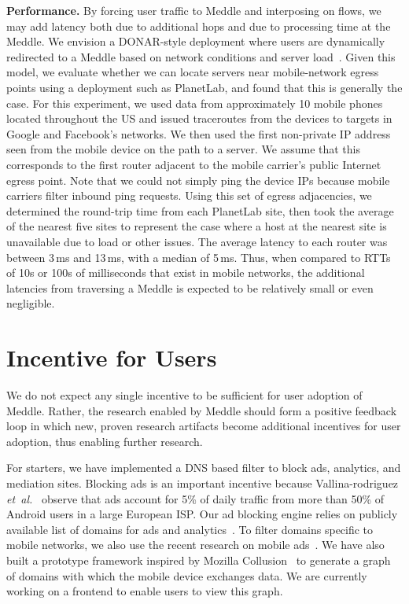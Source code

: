 \documentclass{sig-alternate-10pt}
\newcommand{\etal}{\emph{et~al.}}
\newcommand{\meddle}{{Meddle}\xspace}
\begin{document}
\noindent\textbf{Performance.} By forcing user traffic to \meddle 
and interposing on flows, we may add latency both due to additional
hops and due to processing time at the \meddle. We envision a
DONAR-style deployment where users are dynamically redirected to a
\meddle based on network conditions and server
load~\cite{wendell:donar}. Given this model, we evaluate whether we
can locate servers near mobile-network egress points using a
deployment such as PlanetLab, and found that this is generally the
case. For this experiment, we used data from approximately 10 mobile
phones located throughout the US and issued traceroutes from the
devices to targets in Google and Facebook's networks. We then used the
first non-private IP address seen from the mobile device on the path
to a server. We assume that this corresponds to the first router
adjacent to the mobile carrier's public Internet egress point. Note
that we could not simply ping the device IPs because mobile carriers
filter inbound ping requests. Using this set of egress adjacencies, we
determined the round-trip time from each PlanetLab site, then took the
average of the nearest five sites to represent the case where a host
at the nearest site is unavailable due to load or other issues. The
average latency to each router was between 3\,ms and 13\,ms, with a
median of 5\,ms. Thus, when compared to RTTs of 10s or 100s of
milliseconds that exist in mobile networks, the additional latencies
from traversing a \meddle is expected to be relatively small or
even negligible.

\section{Incentive for Users}

We do not expect any single incentive to be sufficient for user
adoption of \meddle. Rather, the research enabled by \meddle should
form a positive feedback loop in which new, proven research artifacts
become additional incentives for user adoption, thus enabling further
research.  

For starters, we have implemented a DNS based filter to block ads,
analytics, and mediation sites. Blocking ads is an important incentive
because Vallina-rodriguez \etal~\cite{Vallina-rodriguez:2012:AdCache}
observe that ads account for 5\% of daily traffic from more than 50\%
of Android users in a large European ISP. Our ad blocking engine
relies on publicly available 
list of domains for ads and analytics~\cite{YoyoAds}. To filter
domains specific to mobile networks, we also use the recent research
on mobile ads~\cite{Leontiadis:2012:AdsMobile, hornyack:appfence}. We
have also built a prototype framework inspired by Mozilla
Collusion~\cite{collusion} to generate a graph of domains with which
the mobile device exchanges data. We are currently working on a
frontend to enable users to view this graph.
\end{document}
